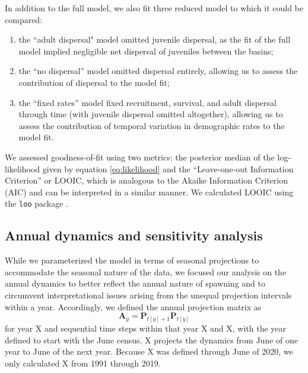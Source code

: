 \documentclass[11pt]{article}
\begin{document}
In addition to the full model,
we also fit three reduced model to which it could be compared:
%
\begin{enumerate}[label=(\arabic*)]
\item
the ``adult dispersal" model omitted juvenile dispersal,
as the fit of the full model implied negligible net dispersal of juveniles between the basins;
%
\item
the ``no dispersal'' model omitted dispersal entirely,
allowing us to assess the contribution of dispersal to the model fit;
%
\item
the ``fixed rates'' model fixed recruitment, survival, and adult dispersal through time
(with juvenile dispersal omitted altogether),
allowing us to assess the contribution of temporal variation in demographic rates
to the model fit.
\end{enumerate}
%
We assessed goodness-of-fit using two metrics:
the posterior median of the log-likelihood given by equation \ref{eq:likelihood}
and the ``Leave-one-out Information Criterion'' or LOOIC,
which is analogous to the Akaike Information Criterion (AIC)
and can be interpreted in a similar manner.
We calculated LOOIC using the \texttt{loo} package \citep{vehtari2020}.





\subsection*{Annual dynamics and sensitivity analysis}


While we parameterized the model in terms of seasonal projections
to accommodate the seasonal nature of the data,
we focused our analysis on the annual dynamics to better reflect
the annual nature of spawning and to circumvent interpretational
issues arising from the unequal projection intervals within a year.
Accordingly, we defined the annual projection matrix as
%
\begin{equation} \label{eq:A}
\mathbf{A}_y = \mathbf{P}_{t[y]+1} \mathbf{P}_{t[y]}
\end{equation}
%
for year X and sequential time steps within that year X and X,
with the year defined to start with the June census.
X projects the dynamics from
June of one year to June of the next year.
Because X was defined through June of 2020,
we only calculated X from 1991 through 2019.
\end{document}
